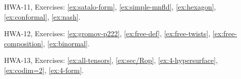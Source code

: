 HWA-11, Exercises: 
\ref{ex:satalo-form}, 
\ref{ex:simple-mnfld}, 
\ref{ex:hexagon}, 
\ref{ex:conformal},
\ref{ex:nash}.

HWA-12, Exercises: 
\ref{ex:gromov-p222},
\ref{ex:free-def},
\ref{ex:free-twists},
\ref{ex:free-composition},
\ref{ex:binormal}.

HWA-13, Exercises: 
\ref{ex:all-tensors},
\ref{ex:sec/Rop},
\ref{ex:4-hypersurface},
\ref{ex:codim=2},
\ref{ex:4-form}.
